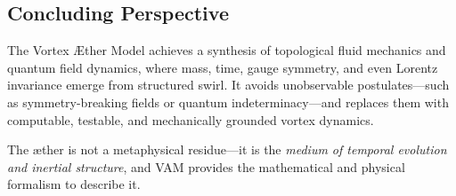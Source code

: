 \subsection*{Concluding Perspective}

The Vortex \AE{}ther Model achieves a synthesis of topological fluid mechanics and quantum field dynamics, where mass, time, gauge symmetry, and even Lorentz invariance emerge from structured swirl. It avoids unobservable postulates—such as symmetry-breaking fields or quantum indeterminacy—and replaces them with computable, testable, and mechanically grounded vortex dynamics.

The æther is not a metaphysical residue—it is the \emph{medium of temporal evolution and inertial structure}, and VAM provides the mathematical and physical formalism to describe it.

